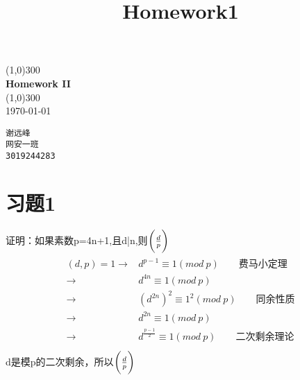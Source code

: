 \documentclass[UTF8,fleqn]{article}
\title{Homework1}
\begin{document}
\begin{titlepage}
    \begin{center}
        \line(1,0){300}\\
        [0.65cm]
        \huge{\bfseries Homework II }\\
        \line(1,0){300}\\
        \textnormal{\Large \today}\\
        [5.5cm]
    \end{center}
    \begin{flushright}
        \texttt{\Large 谢远峰\\网安一班\\3019244283}\\
        [0.5cm]
    \end{flushright}
\end{titlepage}


\section*{习题1}
证明：如果素数p=4n+1,且d|n,则$\bigg{(}\frac{d}{p}\bigg{)}$  \\
\begin{align*}
    \begin{split}
        (d,p)=1 \rightarrow &d^{p-1}\equiv 1(mod\ p) \qquad \text{费马小定理}\\
        \rightarrow &d^{4n}\equiv 1(mod\ p)\\
        \rightarrow &(d^{2n})^{2}\equiv 1^2(mod\ p)\qquad \text{同余性质}\\
        \rightarrow &d^{2n}\equiv 1(mod\ p)\\
        \rightarrow &d^{\frac{p-1}{2}}\equiv 1(mod\ p)\qquad \text{二次剩余理论}\\
    \end{split}
\end{align*}
\qquad d是模p的二次剩余，所以$\bigg{(}\frac{d}{p}\bigg{)}$
\end{document}
